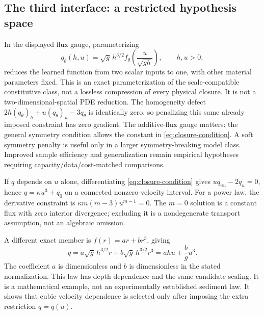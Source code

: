 \documentclass[11pt,a4paper,oneside]{report}
\numberwithin{equation}{chapter}
\begin{document}
\subsection*{The third interface: a restricted hypothesis space}
In the displayed flux gauge, parameterizing
\begin{equation}\label{eq:closure-network}
q_\theta(h,u)=\sqrt g\,h^{3/2}
f_\theta\left(\frac{u}{\sqrt{gh}}\right),\qquad h,u>0,
\end{equation}
reduces the learned function from two scalar inputs to one, with other
material parameters fixed. This is an exact parameterization of the
scale-compatible constitutive class, not a lossless compression of every
physical closure. It is not a two-dimensional-spatial PDE reduction.
The homogeneity defect $2h(q_\theta)_h+u(q_\theta)_u-3q_\theta$ is identically
zero, so penalizing this same already imposed constraint has zero gradient.
The additive-flux gauge matters: the general symmetry condition allows
the constant in \eqref{eq:closure-condition}.
A soft symmetry penalty is useful only in a larger symmetry-breaking
model class. Improved sample efficiency and generalization remain empirical
hypotheses requiring capacity/data/cost-matched comparisons.

If $q$ depends on $u$ alone, differentiating \eqref{eq:closure-condition} gives $uq_{uu}-2q_u=0$, hence $q=\kappa u^3+q_0$ on a connected nonzero-velocity interval. For a power law, the derivative constraint is $\kappa m(m-3)u^{m-1}=0$. The $m=0$ solution is a constant flux with zero interior divergence; excluding it is a nondegenerate transport assumption, not an algebraic omission.

A different exact member is $f(r)=ar+br^3$, giving
\begin{equation}\label{eq:example-family}
q=a\sqrt g\,h^{3/2}r+b\sqrt g\,h^{3/2}r^3
=ahu+\frac b g u^3.
\end{equation}
The coefficient $a$ is dimensionless and $b$ is dimensionless in the stated normalization. This law has depth dependence and the same candidate scaling. It is a mathematical example, not an experimentally established sediment law. It shows that cubic velocity dependence is selected only after imposing the extra restriction $q=q(u)$.
\end{document}
